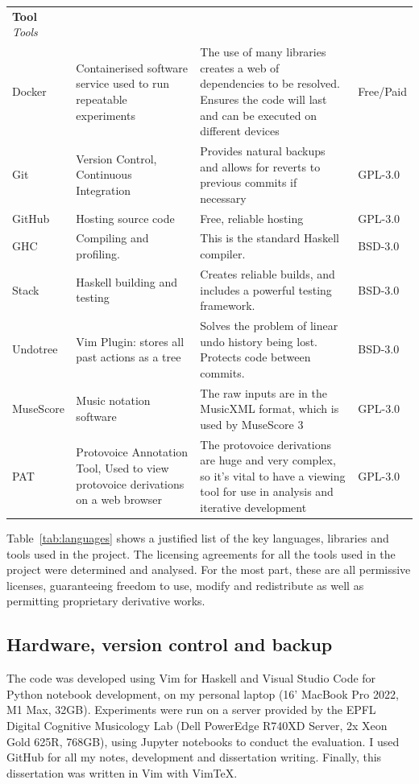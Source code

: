 \documentclass[12pt,a4paper,twoside,openright]{report} \usepackage[pdfborder={0 0 0}]{hyperref}    %
\theoremstyle{definition} \newtheorem{definition}{Definition}[section]
\begin{document}
\begin{table}[h!]
\begin{tabularx}{\textwidth}{p{4em}X X p{4em}} {\normalsize \textbf{Tool}}
        \textit{Tools} &&&\\ Docker & Containerised software service used to run repeatable experiments & The use of
        many libraries creates a web of dependencies to be resolved. Ensures the code will last and can be executed on
        different devices & Free/Paid \\ Git & Version Control, Continuous Integration & Provides natural backups and
        allows for reverts to previous commits if necessary & GPL-3.0 \\ GitHub & Hosting source code & Free, reliable
        hosting & GPL-3.0 \\ GHC & Compiling and profiling. & This is the standard Haskell compiler. & BSD-3.0 \\ Stack
                & Haskell building and testing  & Creates reliable builds, and includes a powerful testing framework.
                & BSD-3.0 \\ Undotree & Vim Plugin: stores all past actions as a tree & Solves the problem of linear
        undo history being lost. Protects code between commits. & BSD-3.0 \\ MuseScore & Music notation software & The
        raw inputs are in the MusicXML format, which is used by MuseScore 3 & GPL-3.0 \\ PAT & Protovoice Annotation
        Tool, Used to view protovoice derivations on a web browser & The protovoice derivations are huge and very
      complex, so it's vital to have a viewing tool for use in analysis and iterative development & GPL-3.0 \\
    \end{tabularx} \end{table}

    Table~\ref{tab:languages} shows a justified list of the key languages, libraries and tools used in the project. The
    licensing agreements for all the tools used in the project were determined and analysed. For the most part, these
    are all permissive licenses, guaranteeing freedom to use, modify and redistribute as well as permitting proprietary
    derivative works. 

    \subsection{Hardware, version control and backup} The code was developed using Vim for Haskell and Visual Studio
    Code for Python notebook development, on my personal laptop (16' MacBook Pro 2022, M1 Max, 32GB). Experiments were
    run on a server provided by the EPFL Digital Cognitive Musicology Lab (Dell PowerEdge R740XD Server, 2x Xeon Gold
    625R, 768GB), using Jupyter notebooks to conduct the evaluation. I used GitHub for all my notes, development and
    dissertation writing. Finally, this dissertation was written in Vim with VimTeX.
\end{document}
